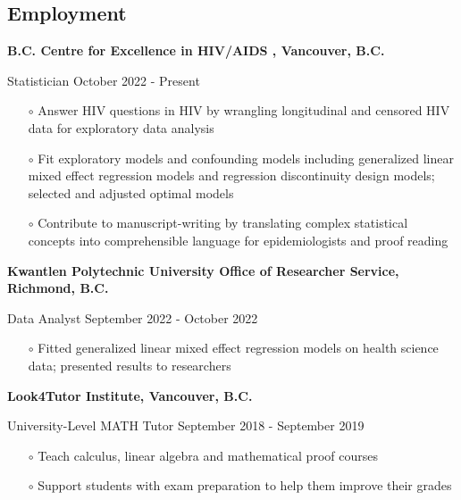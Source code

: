 \documentclass[margin,line]{res}
\newenvironment{list1}{
  \begin{list}{\ding{113}}{%
      \setlength{\itemsep}{0in}
      \setlength{\parsep}{0in} \setlength{\parskip}{0in}
      \setlength{\topsep}{0in} \setlength{\partopsep}{0in}
      \setlength{\leftmargin}{0.17in}}}{\end{list}}
\begin{document}
\begin{resume}
\section{\sc Employment}
{\bf B.C. Centre for Excellence in HIV/AIDS , Vancouver, B.C.}\\
\vspace*{-.1in}
\begin{list1}
\item[]Statistician \hfill October 2022 - Present
\begin{itemize}
\item[$\circ$] Answer HIV questions in HIV by wrangling longitudinal and censored HIV data for exploratory data analysis
\item[$\circ$] Fit exploratory models and confounding models including generalized linear mixed effect regression models and regression discontinuity design models; selected and adjusted optimal models
\item[$\circ$] Contribute to manuscript-writing by translating complex statistical concepts into comprehensible language for epidemiologists and proof reading
\end{itemize}
\end{list1}
{\bf Kwantlen Polytechnic University Office of Researcher Service, Richmond, B.C.}\\
\vspace*{-.1in}
\begin{list1}
\item[]Data Analyst  \hfill September 2022 - October 2022
\begin{itemize}
\item[$\circ$] Fitted generalized linear mixed effect regression models on health science data; presented results to researchers
\end{itemize}
\end{list1}
{\bf Look4Tutor Institute, Vancouver, B.C.}\\
\vspace*{-.1in}
\begin{list1}
\item[]University-Level MATH Tutor \hfill September 2018 - September 2019
\begin{itemize}
\item[$\circ$] Teach calculus, linear algebra and mathematical proof courses
\item[$\circ$] Support students with exam preparation to help them improve their grades
\end{itemize}
\end{list1}

\end{resume}
\end{document}
